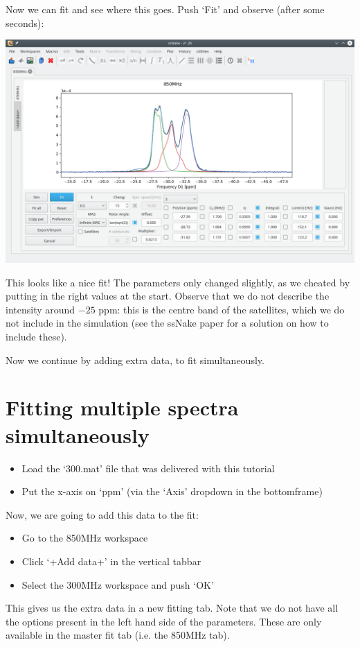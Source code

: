 \documentclass[11pt,a4paper]{article}
\begin{document}
Now we can fit and see where this goes. Push `Fit' and observe (after some seconds):
\begin{center}
\includegraphics[width=1.0\linewidth]{Figs/Fig7.png}
\end{center}
This looks like a nice fit! The parameters only changed slightly, as we cheated by putting in the
right values at the start. Observe that we do not describe the intensity around $-25$ ppm: this is
the centre band of the satellites, which we do not include in the simulation (see the ssNake paper
for a solution on how to include these).

Now we continue by adding extra data, to fit simultaneously.

\section{Fitting multiple spectra simultaneously}
\begin{itemize}
  \item Load the `300.mat' file that was delivered with this tutorial
  \item Put the x-axis on `ppm' (via the `Axis' dropdown in the bottomframe)
\end{itemize}

Now, we are going to add this data to the fit:
\begin{itemize}
  \item Go to the 850MHz workspace
  \item Click `+Add data+' in the vertical tabbar
  \item Select the 300MHz workspace and push `OK'
\end{itemize}
This gives us the extra data in a new fitting tab. Note that we do not have all the options present
in the left hand side of the parameters. These are only available in the master fit tab (i.e. the
850MHz tab). 
\end{document}
